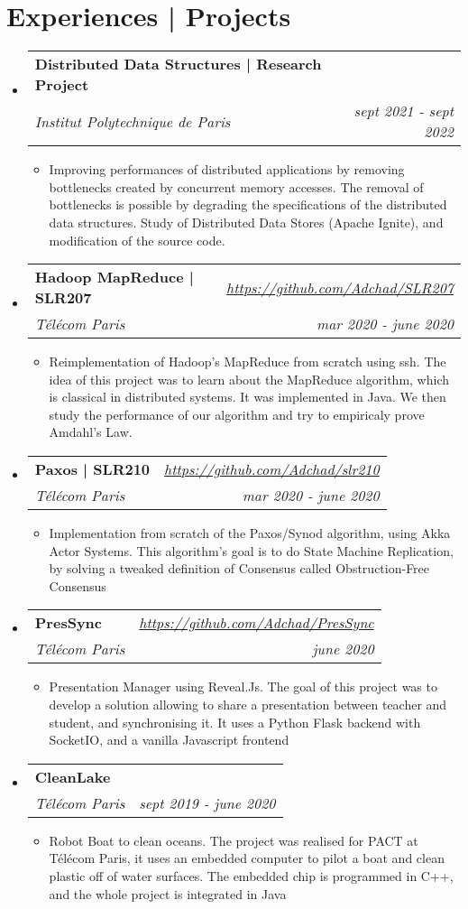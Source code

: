 \documentclass[a4paper,20pt]{article}
\makeatletter
\newcommand{\resumeItemWithoutTitle}[1]{
  \item\small{
    {\vspace{-2pt}#1}
  }
}
\newcommand{\resumeSubheading}[4]{
  \vspace{-1pt}\item
    \begin{tabular*}{0.97\textwidth}{l@{\extracolsep{\fill}}r}
      \textbf{#1} & #2 \\
      \textit{#3} & \textit{#4} \\
    \end{tabular*}\vspace{-5pt}
}
\newcommand{\resumeSubHeadingListStart}{\begin{itemize}[leftmargin=*]}
\newcommand{\resumeSubHeadingListEnd}{\end{itemize}}
\newcommand{\resumeItemListStart}{\begin{itemize}}
\newcommand{\resumeItemListEnd}{\end{itemize}\vspace{-5pt}}
\makeatother
\begin{document}
\section{Experiences | Projects}
 \resumeSubHeadingListStart
  \resumeSubheading
  {Distributed Data Structures | Research Project}{ }
  {Institut Polytechnique de Paris}{sept 2021 - sept 2022}
   \resumeItemListStart 
    \resumeItemWithoutTitle
    {Improving performances of distributed applications by removing bottlenecks created by concurrent memory accesses. The removal of bottlenecks is possible by degrading the specifications of the distributed data structures. Study of Distributed Data Stores (Apache Ignite), and modification of the source code. }
   \resumeItemListEnd 
  \resumeSubheading
  {Hadoop MapReduce | SLR207}{\textit{\href{https://github.com/Adchad/SLR207}{https://github.com/Adchad/SLR207}}}
  {Télécom Paris}{mar 2020 - june 2020 }
   \resumeItemListStart 
    \resumeItemWithoutTitle
    {Reimplementation of Hadoop's MapReduce from scratch using ssh. The idea of this project was to learn about the MapReduce algorithm, which is classical in distributed systems. It was implemented in Java. We then study the performance of our algorithm and try to empiricaly prove Amdahl's Law. }
   \resumeItemListEnd 
  \resumeSubheading
  {Paxos | SLR210}{\textit{\href{https://github.com/Adchad/slr220}{https://github.com/Adchad/slr210}}}
  {Télécom Paris}{mar 2020 - june 2020 }
   \resumeItemListStart 
    \resumeItemWithoutTitle
    {Implementation from scratch of the Paxos/Synod algorithm, using Akka Actor Systems. This algorithm's goal is to do State Machine Replication, by solving a tweaked definition of Consensus called Obstruction-Free Consensus}
   \resumeItemListEnd 
  \resumeSubheading
  {PresSync}{\textit{\href{https://github.com/Adchad/PresSync}{https://github.com/Adchad/PresSync}}}
  {Télécom Paris}{june 2020}
   \resumeItemListStart 
    \resumeItemWithoutTitle
    {Presentation Manager using Reveal.Js. The goal of this project was to develop a solution allowing to share a presentation between teacher and student, and synchronising it. It uses a Python Flask backend with SocketIO, and a vanilla Javascript frontend}
   \resumeItemListEnd 
  \resumeSubheading
  {CleanLake}{ }
  {Télécom Paris}{sept 2019 - june 2020}
   \resumeItemListStart 
    \resumeItemWithoutTitle
    {Robot Boat to clean oceans. The project was realised for PACT at Télécom Paris, it uses an embedded computer to pilot a boat and clean plastic off of water surfaces. The embedded chip is programmed in C++, and the whole project is integrated in Java}
   \resumeItemListEnd 
 \resumeSubHeadingListEnd
\end{document}
